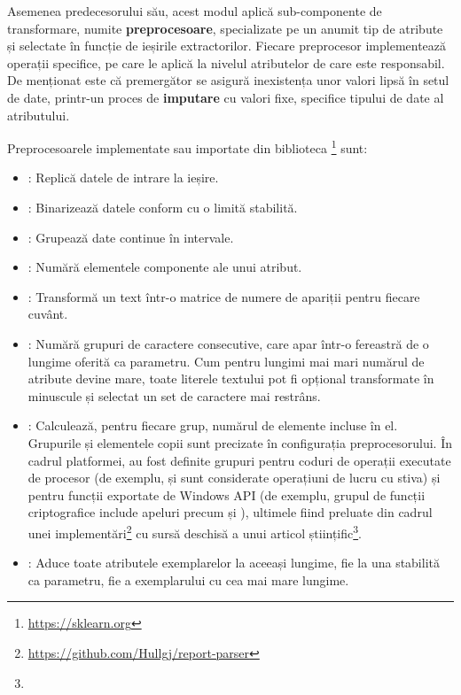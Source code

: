 \documentclass[../../main.tex]{subfiles}
\begin{document}
Asemenea predecesorului său, acest modul aplică sub-componente de transformare, numite \textbf{preprocesoare}, specializate pe un anumit tip de atribute și selectate în funcție de ieșirile extractorilor. Fiecare preprocesor implementează operații specifice, pe care le aplică la nivelul atributelor de care este respon\-sabil. De menționat este că premergător se asigură inexistența unor valori lipsă în setul de date, printr-un proces de \textbf{imputare} cu valori fixe, specifice tipului de date al atributului.

Preprocesoarele implementate sau importate din biblioteca \footnote{\href{https://sklearn.org}{https://sklearn.org}} sunt:

\begin{itemize}
    \item {}: Replică datele de intrare la ieșire.
    \item {}: Binarizează datele conform cu o limită stabilită.
    \item {}: Grupează date continue în intervale.
    \item {}: Numără elementele componente ale unui atribut.
    \item {}: Transformă un text într-o matrice de numere de apari\-ții pentru fiecare cuvânt.
    \item {}: Numără grupuri de caractere consecutive, care apar într-o fe\-reastră de o lungime oferită ca parametru. Cum pentru lungimi mai mari numărul de atribute devine mare, toate literele textului pot fi opțional transformate în minuscule și selectat un set de caractere mai restrâns.
    \item {}: Calculează, pentru fiecare grup, numărul de elemente incluse în el. Grupurile și elementele copii sunt precizate în configurația preprocesorului. În cadrul platformei, au fost definite grupuri pentru coduri de operații executate de procesor (de exemplu,  și  sunt conside\-rate operațiuni de lucru cu stiva) și pentru funcții exportate de Windows API (de exemplu, grupul de funcții criptografice include apeluri precum  și ), ultimele fiind preluate din cadrul unei implementări\footnote{\href{https://github.com/Hullgj/report-parser}{https://github.com/Hullgj/report-parser}} cu sursă deschisă a unui articol științific\footnote{}.
    \item {}: Aduce toate atributele exemplarelor la aceeași lungi\-me, fie la una stabilită ca parametru, fie a exemplarului cu cea mai mare lungime.
\end{itemize}
\end{document}
